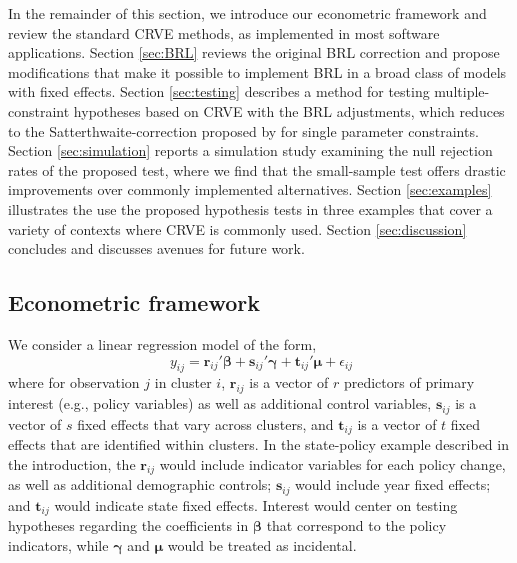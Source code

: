 \documentclass[12pt]{article}\usepackage[]{graphicx}\usepackage[]{color}
\newcommand{\bm}{\mathbf}
\newcommand{\bs}{\boldsymbol}
\begin{document}
In the remainder of this section, we introduce our econometric framework and review the standard CRVE methods, as implemented in most software applications.
Section \ref{sec:BRL} reviews the original BRL correction and propose modifications that make it possible to implement BRL in a broad class of models with fixed effects.
Section \ref{sec:testing} describes a method for testing multiple-constraint hypotheses based on CRVE with the BRL adjustments, which reduces to the Satterthwaite-correction proposed by \citet{Bell2002bias} for single parameter constraints. 
Section \ref{sec:simulation} reports a simulation study examining the null rejection rates of the proposed test, where we find that the small-sample test offers drastic improvements over commonly implemented alternatives. 
Section \ref{sec:examples} illustrates the use the proposed hypothesis tests in three examples that cover a variety of contexts where CRVE is commonly used. 
Section \ref{sec:discussion} concludes and discusses avenues for future work. 

\subsection{Econometric framework}

We consider a linear regression model of the form,
\begin{equation}
\label{eq:fixed_effects_ij}
\ {y}_{ij} = \bm{r}_{ij}' \bs\beta + \bm{s}_{ij}' \bs\gamma + \bm{t}_{ij}' \bs\mu + \epsilon_{ij} 
\end{equation}
where for observation $j$ in cluster $i$, $\bm{r}_{ij}$ is a vector of $r$ predictors of primary interest (e.g., policy variables) as well as additional control variables, $\bm{s}_{ij}$ is a vector of $s$ fixed effects that vary across clusters, and $\bm{t}_{ij}$ is a vector of $t$ fixed effects that are identified within clusters. In the state-policy example described in the introduction, the $\bm{r}_{ij}$ would include indicator variables for each policy change, as well as additional demographic controls; $\bm{s}_{ij}$ would include year fixed effects; and $\bm{t}_{ij}$ would indicate state fixed effects. Interest would center on testing hypotheses regarding the coefficients in $\bs\beta$ that correspond to the policy indicators, while $\bs\gamma$ and $\bs\mu$ would be treated as incidental. 
\end{document}
